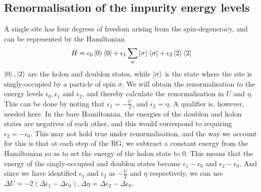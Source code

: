 \documentclass{report}
\numberwithin{equation}{section}
\begin{document}
\begin{appendices}
\section{Renormalisation of the impurity energy levels}
A single site has four degrees of freedom arising from the spin-degeneracy, and can be represented by the Hamiltonian
\begin{equation}\begin{aligned}
	H = \epsilon_0 \ket{0}\bra{0} + \epsilon_1 \sum_\sigma\ket{\sigma}\bra{\sigma} + \epsilon_2 \ket{2}\bra{2}
\end{aligned}\end{equation}
\(\ket{0},\ket{2}\) are the holon and doublon states, while \(\ket{\sigma}\) is the state where the site is singly-occupied by a particle of spin \(\sigma\). We will obtain the renormalisation to the energy levels \(\epsilon_0,\epsilon_1\) and \(\epsilon_2\), and thereby calculate the renormalisation in \(U\) and \(\eta\). This can be done by noting that \(\epsilon_1 = -\frac{U}{2}\), and \(\epsilon_2 = \eta\). A qualifier is, however, needed here. In the bare Hamiltonian, the energies of the doublon and holon states are negatives of each other, and this would correspond to requiring \(\epsilon_2 = -\epsilon_0\). This may not hold true under renormalisation, and the way we account for this is that at each step of the RG, we subtract a constant energy from the Hamiltonian so as to set the energy of the holon state to 0. This means that the energy of the singly-occupied and doublon states become \(\epsilon_1 - \epsilon_0\) and \(\epsilon_2 - \epsilon_0\). And since we have identified \(\epsilon_1\) and \(\epsilon_2\) as \(-\frac{U}{2}\) and \(\eta\) respectively, we can use \(\Delta U = -2\left(\Delta \epsilon_1 - \Delta \epsilon_0\right), \Delta \eta = \Delta \epsilon_2 - \Delta \epsilon_0 \).


\end{appendices}
\end{document}
